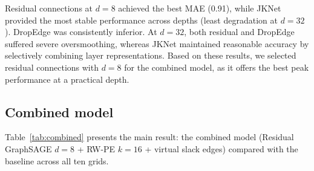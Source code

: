 \documentclass[preprint,review,12pt]{elsarticle}
\begin{document}
Residual connections at $d=8$ achieved the best MAE (0.91), while JKNet provided the most stable performance across depths (least degradation at $d=32$). DropEdge was consistently inferior. At $d=32$, both residual and DropEdge suffered severe oversmoothing, whereas JKNet maintained reasonable accuracy by selectively combining layer representations. Based on these results, we selected residual connections with $d=8$ for the combined model, as it offers the best peak performance at a practical depth.

\subsection{Combined model}

Table~\ref{tab:combined} presents the main result: the combined model (Residual GraphSAGE $d=8$ + RW-PE $k=16$ + virtual slack edges) compared with the baseline across all ten grids.
\end{document}
